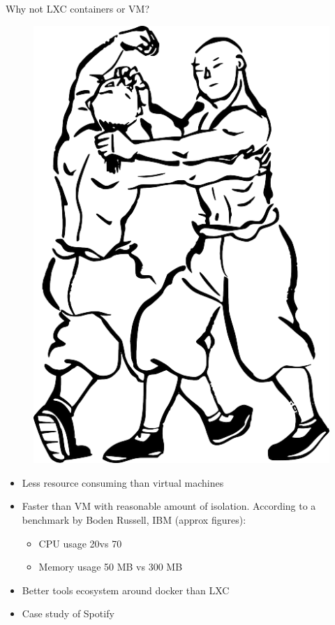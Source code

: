 \documentclass{beamer}
\begin{document}
\begin{frame}{Why not LXC containers or VM?}
\begin{figure}[htp]
\centering
\includegraphics[scale=0.15]{fight.png}
\label{}
\end{figure}
\begin{itemize}
  \item Less resource consuming than virtual machines
  \item Faster than VM with reasonable amount of isolation. According to a benchmark by Boden Russell, IBM (approx figures):
  \begin{itemize}
    \item CPU usage 20\percent vs 70\percent
    \item Memory usage 50 MB vs 300 MB
  \end{itemize}    
  \item Better tools ecosystem around docker than LXC
  \item Case study of Spotify
\end{itemize}
\end{frame}
\end{document}
